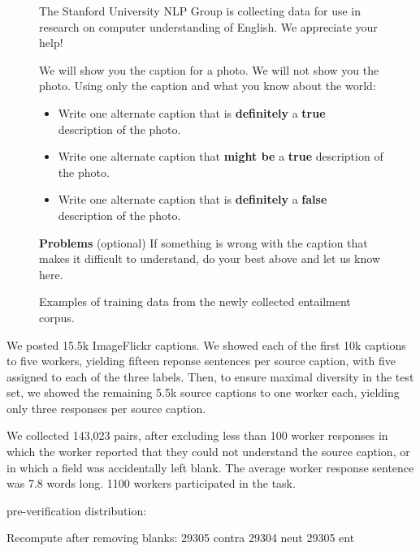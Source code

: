 \begin{figure}
\footnotesize
The Stanford University NLP Group is collecting data for use in research on computer understanding of English. We appreciate your help!

We will show you the caption for a photo. We will not show you the photo. Using only the caption and what you know about the world:
\begin{itemize}
\item Write one alternate caption that is \textbf{definitely} a \textbf{true} description of the photo. 
\item Write one alternate caption that \textbf{might be} a \textbf{true} description of the photo. 
\item Write one alternate caption that is \textbf{definitely} a \textbf{false} description of the photo. 
\end{itemize}
\textbf{Problems} (optional)   If something is wrong with the caption that makes it difficult to understand, do your best above and let us know here.
\caption{\label{instructions-1}Examples of training data from the newly collected entailment corpus.}
\end{figure}


We posted 15.5k ImageFlickr captions. We showed each of the first 10k captions to five workers, yielding fifteen reponse sentences per source caption, with five assigned to each of the three labels. Then, to ensure maximal diversity in the test set, we showed the remaining 5.5k source captions to one worker each,  yielding only three responses per source caption.

We collected 143,023 pairs, after excluding less than 100 worker responses in which the worker reported that they could not understand the source caption, or in which a field was accidentally left blank. The average worker response sentence was 7.8 words long. 1100 workers participated in the task.

pre-verification distribution:

Recompute after removing blanks:
29305 contra
29304 neut
29305 ent

